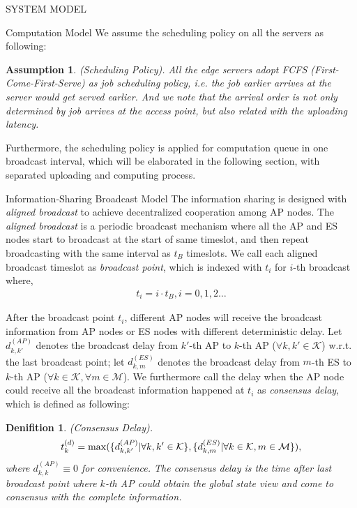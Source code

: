 \documentclass[10pt, conference, letterpaper]{IEEEtran}
\newtheorem{definition}{Denifition}
\newtheorem{assumption}{Assumption}
\DeclarePairedDelimiter{\set}{\{}{\}}
\newcommand{\apSet}{\mathcal{K}}
\newcommand{\esSet}{\mathcal{M}}
\begin{document}
\begin{section}{SYSTEM MODEL}
\begin{subsection}{Computation Model}
            We assume the scheduling policy on all the servers as following:
            \begin{assumption}
                (Scheduling Policy).
                All the edge servers adopt \emph{FCFS} (First-Come-First-Serve) as job scheduling policy, i.e. the job earlier arrives at the server would get served earlier. And we note that the arrival order is not only determined by job arrives at the access point, but also related with the uploading latency.
            \end{assumption}
            Furthermore, the scheduling policy is applied for computation queue in one broadcast interval, which will be elaborated in the following section, with separated uploading and computing process.
        \end{subsection}

        \begin{subsection}{Information-Sharing Broadcast Model}
            The information sharing is designed with \emph{aligned broadcast} to achieve decentralized cooperation among AP nodes. The \emph{aligned broadcast} is a periodic broadcast mechanism where all the AP and ES nodes start to broadcast at the start of same timeslot, and then repeat broadcasting with the same interval as $t_B$ timeslots. We call each aligned broadcast timeslot as \emph{broadcast point}, which is indexed with $t_i$ for $i$-th broadcast where,
            \begin{align}
                t_i = i \cdot t_B, i=0,1,2\dots
            \end{align}

            After the broadcast point $t_i$, different AP nodes will receive the broadcast information from AP nodes or ES nodes with different deterministic delay.
            Let $d^{(AP)}_{k,k'}$ denotes the broadcast delay from $k'$-th AP to $k$-th AP ($\forall k,k'\in\apSet$) w.r.t. the last broadcast point; let $d^{(ES)}_{k,m}$ denotes the broadcast delay from $m$-th ES to $k$-th AP ($\forall k\in\apSet,\forall m\in\esSet$). We furthermore call the delay when the AP node could receive all the broadcast information happened at $t_i$ as \emph{consensus delay}, which is defined as following:
            \begin{definition}
                (Consensus Delay).
                \begin{align}
                    t^{(d)}_k = \max(\set{d^{(AP)}_{k,k'}|\forall k,k'\in\apSet}, \set{d^{(ES)}_{k,m}|\forall k\in\apSet,m\in\esSet}),
                \end{align}
                where $d^{(AP)}_{k,k} \equiv 0$ for convenience. The consensus delay is the time after last broadcast point where $k$-th AP could obtain the global state view and come to consensus with the complete information.
            \end{definition}
                        

\end{subsection}
\end{section}
\end{document}
